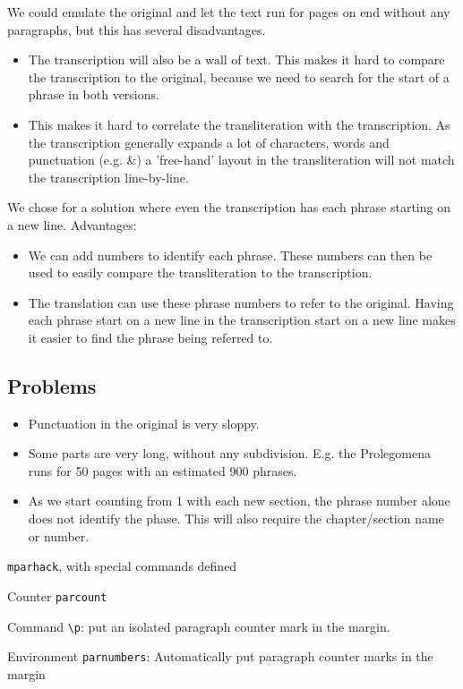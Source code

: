 \documentclass{report}
\begin{document}
We could emulate the original and let the text run for pages on end without any paragraphs, but this has
several disadvantages.
\begin{itemize}
\item The transcription will also be a wall of text. This makes it hard to compare the transcription to the original, because
we need to search for the start of a phrase in both versions.
\item This makes it hard to correlate the transliteration with the transcription. As the transcription generally expands
a lot of characters, words and punctuation (e.g. \&) a 'free-hand' layout in the transliteration will not match the transcription
line-by-line.
\end{itemize}
We chose for a solution where even the transcription has each phrase starting on a new line. Advantages:
\begin{itemize}
\item We can add numbers to identify each phrase. These numbers can then be used to easily compare the transliteration
to the transcription.
\item The translation can use these phrase numbers to refer to the original. Having each phrase start on a new line
in the transcription start on a new line makes it easier to find the phrase being referred to.
\end{itemize}

\subsection{Problems}
\begin{itemize}
\item Punctuation in the original is very sloppy.
\item Some parts are very long, without any subdivision. E.g. the Prolegomena runs for
50 pages with an estimated 900 phrases.
\item As we start counting from 1 with each new section, the phrase number alone does not identify the phase. This will
also require the chapter/section name or number.
\end{itemize}


\texttt{mparhack}, with special commands defined

Counter \texttt{parcount}

Command \verb;\p;: put an isolated paragraph counter mark in the margin.

Environment \texttt{parnumbers}: Automatically put paragraph counter marks in the margin
\end{document}
